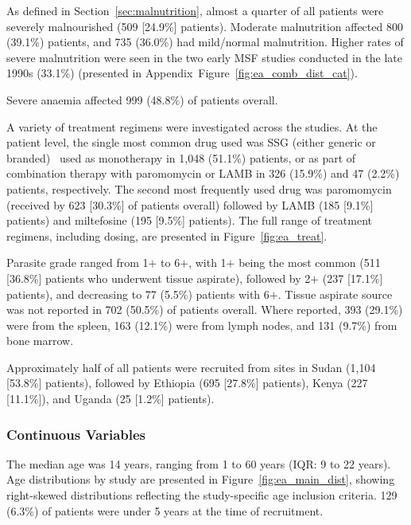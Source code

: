 As defined in Section~\ref{sec:malnutrition}, almost a quarter of all patients were severely malnourished (509 [24.9\%] patients). Moderate malnutrition affected 800 (39.1\%) patients, and 735 (36.0\%) had mild/normal malnutrition. Higher rates of severe malnutrition were seen in the two early MSF studies conducted in the late 1990s (33.1\%)\cite{veeken2000,ritmeijer2001} (presented in Appendix~Figure~\ref{fig:ea_comb_dist_cat}).

Severe anaemia affected 999 (48.8\%) of patients overall.

A variety of treatment regimens were investigated across the studies. At the patient level, the single most common drug used was SSG (either generic or branded) \textemdash\ used as monotherapy in 1,048 (51.1\%) patients, or as part of combination therapy with paromomycin or LAMB in 326 (15.9\%) and 47 (2.2\%) patients, respectively. The second most frequently used drug was paromomycin (received by 623 [30.3\%] of patients overall) followed by LAMB (185 [9.1\%] patients) and miltefosine (195 [9.5\%] patients). The full range of treatment regimens, including dosing, are presented in Figure~\ref{fig:ea_treat}.

Parasite grade ranged from 1$+$ to 6$+$, with 1$+$ being the most common (511 [36.8\%] patients who underwent tissue aspirate), followed by 2$+$ (237 [17.1\%] patients), and decreasing to 77 (5.5\%) patients with 6$+$. Tissue aspirate source was not reported in 702 (50.5\%) of patients overall. Where reported, 393 (29.1\%) were from the spleen, 163 (12.1\%) were from lymph nodes, and 131 (9.7\%) from bone marrow.

Approximately half of all patients were recruited from sites in Sudan (1,104 [53.8\%] patients), followed by Ethiopia (695 [27.8\%] patients), Kenya (227 [11.1\%]), and Uganda (25 [1.2\%] patients).



\subsubsection{Continuous Variables}

The median age was 14 years, ranging from 1 to 60 years (IQR: 9 to 22 years). Age distributions by study are presented in Figure~\ref{fig:ea_main_dist}, showing right-skewed distributions reflecting the study-specific age inclusion criteria. 129 (6.3\%) of patients were under 5 years at the time of recruitment.

